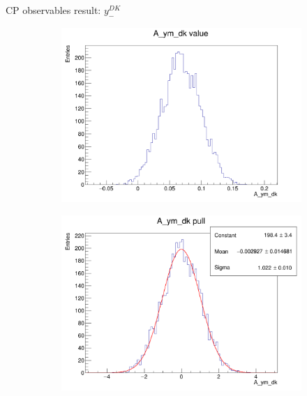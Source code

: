 \documentclass{beamer}
\begin{document}
\begin{frame}{CP observables result: $y_-^{DK}$}
  \begin{figure}
    \centering
    \begin{subfigure}{0.42\textwidth}
      \includegraphics[width = 1.0\textwidth]{Plots/A_ym_dk_value.png}
    \end{subfigure}
    \begin{subfigure}{0.42\textwidth}
      \includegraphics[width = 1.0\textwidth]{Plots/A_ym_dk_pull.png}
    \end{subfigure}%
    \begin{subfigure}{0.42\textwidth}

\end{subfigure}
\end{figure}
\end{frame}
\end{document}
